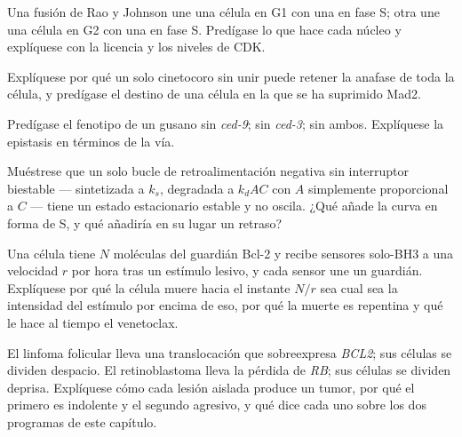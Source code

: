 \begin{exercise}[$\star\star$]\label{exo:b3:cell-cycle-apoptosis:7}
Una fusión de Rao y Johnson une una célula en G1 con una en fase S; otra
une una célula en G2 con una en fase S. Predígase lo que hace cada núcleo
y explíquese con la licencia y los niveles de CDK.
\end{exercise}

\begin{exercise}[$\star\star$]\label{exo:b3:cell-cycle-apoptosis:8}
Explíquese por qué un solo cinetocoro sin unir puede retener la anafase
de toda la célula, y predígase el destino de una célula en la que se ha
suprimido Mad2.
\end{exercise}

\begin{exercise}[$\star\star$]\label{exo:b3:cell-cycle-apoptosis:9}
Predígase el fenotipo de un gusano sin \emph{ced-9}; sin \emph{ced-3};
sin ambos. Explíquese la epistasis en términos de la vía.
\end{exercise}

\begin{exercise}[$\star\star\star$]\label{exo:b3:cell-cycle-apoptosis:10}
Muéstrese que un solo bucle de retroalimentación negativa sin
interruptor biestable ---  sintetizada a $k_{s}$, degradada a
$k_{d}AC$ con $A$ simplemente proporcional a $C$ --- tiene un estado
estacionario estable y no oscila. ¿Qué añade la curva en forma de S, y
qué añadiría en su lugar un retraso?
\end{exercise}

\begin{exercise}[$\star\star\star$]\label{exo:b3:cell-cycle-apoptosis:11}
Una célula tiene $N$ moléculas del guardián Bcl-2 y recibe sensores
solo-BH3 a una velocidad $r$ por hora tras un estímulo lesivo, y cada
sensor une un guardián. Explíquese por qué la célula muere hacia el
instante $N/r$ sea cual sea la intensidad del estímulo por encima de eso,
por qué la muerte es repentina y qué le hace al tiempo el venetoclax.
\end{exercise}

\begin{exercise}[$\star\star\star$]\label{exo:b3:cell-cycle-apoptosis:12}
El linfoma folicular lleva una translocación que sobreexpresa
\emph{BCL2}; sus células se dividen despacio. El retinoblastoma lleva la
pérdida de \emph{RB}; sus células se dividen deprisa. Explíquese cómo
cada lesión aislada produce un tumor, por qué el primero es indolente y
el segundo agresivo, y qué dice cada uno sobre los dos programas de este
capítulo.
\end{exercise}

